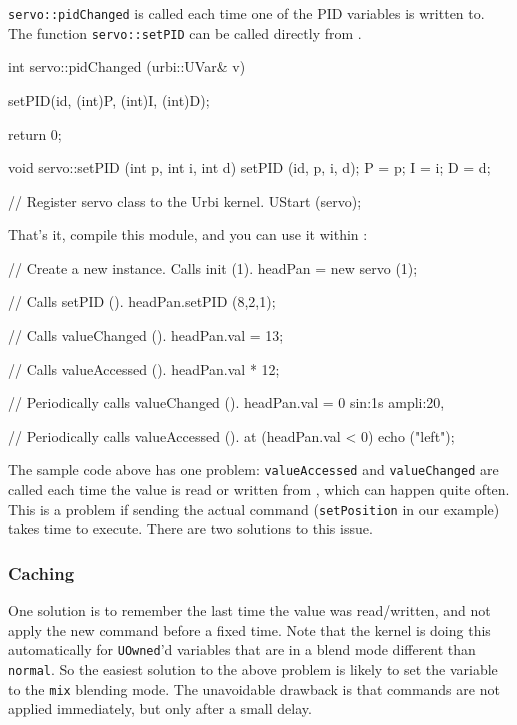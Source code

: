 \lstinline{servo::pidChanged} is called each time one of the PID
variables is written to. The function \lstinline{servo::setPID} can be
called directly from \urbi.

\begin{cxx}
int
servo::pidChanged (urbi::UVar& v)
{
  setPID(id, (int)P, (int)I, (int)D);

  return 0;
}

void
servo::setPID (int p, int i, int d)
{
  setPID (id, p, i, d);
  P = p;
  I = i;
  D = d;
}

// Register servo class to the Urbi kernel.
UStart (servo);
\end{cxx}

That's it, compile this module, and you can use it within \us:

\begin{urbifixme}
// Create a new instance.  Calls init (1).
headPan = new servo (1);

// Calls setPID ().
headPan.setPID (8,2,1);

// Calls valueChanged ().
headPan.val = 13;

// Calls valueAccessed ().
headPan.val * 12;

// Periodically calls valueChanged ().
headPan.val = 0 sin:1s ampli:20,

// Periodically calls valueAccessed ().
at (headPan.val < 0)
  echo ("left");
\end{urbifixme}

The sample code above has one problem: \lstinline{valueAccessed} and
\lstinline{valueChanged} are called each time the value is read or
written from \urbi, which can happen quite often. This is a problem if
sending the actual command (\lstinline{setPosition} in our example)
takes time to execute. There are two solutions to this issue.

\subsubsection{Caching}

One solution is to remember the last time the value was read/written,
and not apply the new command before a fixed time. Note that the
kernel is doing this automatically for \lstinline{UOwned}'d variables
that are in a blend mode different than \lstinline{normal}. So the
easiest solution to the above problem is likely to set the variable to
the \lstinline{mix} blending mode. The unavoidable drawback is that
commands are not applied immediately, but only after a small delay.

